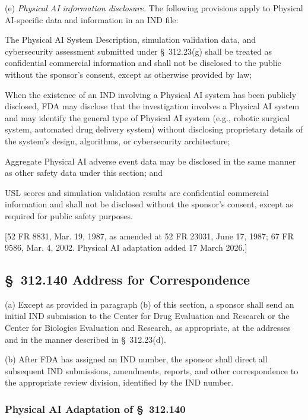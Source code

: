 \documentclass[11pt]{article}
\begin{document}
(e) \textit{Physical AI information disclosure.} The following provisions apply to Physical AI-specific data and information in an IND file:

\begin{description}[leftmargin=0.8cm,style=sameline]
\item[(i)] The Physical AI System Description, simulation validation data, and cybersecurity assessment submitted under \S~312.23(g) shall be treated as confidential commercial information and shall not be disclosed to the public without the sponsor's consent, except as otherwise provided by law;
\item[(ii)] When the existence of an IND involving a Physical AI system has been publicly disclosed, FDA may disclose that the investigation involves a Physical AI system and may identify the general type of Physical AI system (e.g., robotic surgical system, automated drug delivery system) without disclosing proprietary details of the system's design, algorithms, or cybersecurity architecture;
\item[(iii)] Aggregate Physical AI adverse event data may be disclosed in the same manner as other safety data under this section; and
\item[(iv)] USL scores and simulation validation results are confidential commercial information and shall not be disclosed without the sponsor's consent, except as required for public safety purposes.
\end{description}

[52 FR 8831, Mar. 19, 1987, as amended at 52 FR 23031, June 17, 1987; 67 FR 9586, Mar. 4, 2002. Physical AI adaptation added 17 March 2026.]

\subsection{\S~312.140 Address for Correspondence}

(a) Except as provided in paragraph (b) of this section, a sponsor shall send an initial IND submission to the Center for Drug Evaluation and Research or the Center for Biologics Evaluation and Research, as appropriate, at the addresses and in the manner described in \S~312.23(d).

(b) After FDA has assigned an IND number, the sponsor shall direct all subsequent IND submissions, amendments, reports, and other correspondence to the appropriate review division, identified by the IND number.

\subsubsection{Physical AI Adaptation of \S~312.140}
\end{document}

